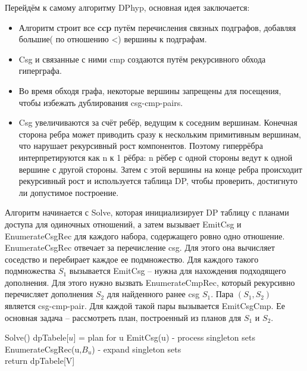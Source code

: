 \documentclass[12pt]{article}
\begin{document}
\begin{flushleft}
Перейдём к самому алгоритму DPhyp, основная идея заключается:
\begin{itemize}
    \item Алгоритм строит все \textbf{ccp} путём перечисления связных подграфов, добавляя большие( по отношению <) 
    вершины к подграфам.
    \item Csg и связанные с ними cmp создаются путём рекурсивного обхода гиперграфа.
    \item Во время обходя графа, некоторые вершины запрещены для посещения, чтобы избежать дублирования csg-cmp-pairs.
    \item Csg увеличиваются за счёт ребёр, ведущим к соседним вершинам. Конечная сторона ребра может приводить сразу к 
    нескольким примитивным вершинам, что нарушает рекурсивный рост компонентов. Поэтому
    гиперрёбра интерпретируются как n к 1 рёбра: n рёбер с одной стороны ведут к одной вершине с другой стороны. 
    Затем с этой вершины на конце ребра происходит рекурсивный рост и используется таблица DP, 
    чтобы проверить, достигнуто ли допустимое построение.
\end{itemize}

Алгоритм начинается с Solve, которая инициализирует DP таблицу с 
планами доступа для одиночных отношений, а затем вызывает EmitCsg 
и EnumerateCsgRec для каждого набора, содержащего ровно одно 
отношение.  EnumerateCsgRec отвечает за перечисление csg.
 Для этого она вычисляет соседство и перебирает каждое ее 
 подмножество. Для каждого такого подмножества $S_1$ вызывается 
 EmitCsg -- нужна  для нахождения  подходящего дополнения. 
 Для этого нужно вызвать EnumerateCmpRec, который рекурсивно перечисляет 
 дополнения $S_2$ для найденного ранее csg $S_1$. 
 Пара $(S_1, S_2)$ является csg-cmp-pair. Для каждой такой пары 
 вызывается EmitCsgCmp. Ее основная задача -- рассмотреть 
 план, построенный из планов для $S_1$  и $S_2$.


\begin{algorithm}
    \begin{algorithmic}[1]
        \State Solve()
            \State dpTabele[${u}$] = plan for u
        \EndFor
            \State EmitCsg({u}) - process singleton sets
            \State EnumerateCsgRec({u},$B_u$) - expand singleton sets
        \EndFor \\
        return dpTabele[V]
    \end{algorithmic}
\end{algorithm}


\end{flushleft}
\end{document}
